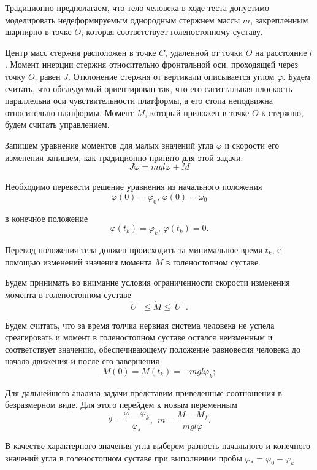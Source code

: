 \documentclass[a4paper,14pt]{article}
\theoremstyle{plain} %
\theoremstyle{definition} %
\theoremstyle{remark} %
\begin{document}
{Традиционно предполагаем, что тело человека в ходе теста допустимо
моделировать недеформируемым однородным стержнем массы $m$,
закрепленным шарнирно в точке $O$, которая соответствует
голеностопному суставу.

Центр масс стержня расположен в точке $C$, удаленной от точки $O$
на расстояние $l$. Момент инерции стержня относительно фронтальной
оси, проходящей через точку $O$, равен $J$. Отклонение стержня от
вертикали описывается углом $\varphi$. Будем считать, что обследуемый
ориентирован так, что его сагиттальная плоскость параллельна оси
чувствительности платформы, а его стопа неподвижна относительно
платформы. Момент $M$, который приложен в точке $O$ к стержню,
будем считать управлением.

Запишем уравнение моментов для малых значений угла $\varphi$ и
скорости его изменения запишем, как традиционно принято для этой задачи.
\begin{equation}\label{6}
    J\ddot{\varphi}= mgl\varphi+M
\end{equation}

Необходимо перевести решение уравнения из начального положения
\begin{equation}\label{7}
    \varphi(0)=\varphi_0, \,\dot{\varphi}(0)=\omega_0
\end{equation}

в конечное положение
\begin{equation}\label{8}
    \varphi(t_k)=\varphi_k,\, \dot{\varphi}(t_k)=0.
\end{equation}

Перевод положения тела должен происходить за минимальное
время $t_k$, с помощью изменений значения момента $M$ в
голеностопном суставе.

Будем принимать во внимание условия ограниченности скорости изменения
момента в голеностопном суставе
\[
    U^-\le\dot{M}\le\ U^+.
\]

Будем считать, что за время толчка нервная система человека
не успела среагировать и момент в голеностопном суставе остался
неизменным и соответствует значению, обеспечивающему положение
равновесия человека до начала движения и после его завершения
\[
    M(0)=M\left(t_k\right)=-mgl\varphi_k;
\]

Для дальнейшего анализа задачи представим приведенные
соотношения в безразмерном виде. Для этого перейдем
к новым переменным
\[
    \theta=\frac{\varphi-\varphi_k}{\varphi_\ast},\ \ m=\frac{M-M_f}{mgl\varphi}.
\]

В качестве характерного значения угла выберем разность
начального и конечного значений угла в голеностопном
суставе при выполнении пробы $\varphi_\ast=\varphi_0-\varphi_k$

}
\end{document}
